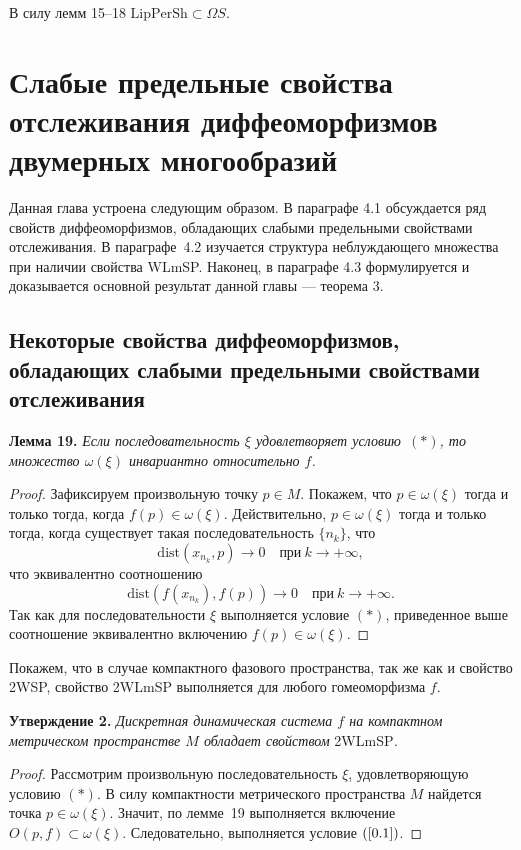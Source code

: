 \documentclass[12pt]{article}
\begin{document}
В силу лемм 15--18 $\mbox{LipPerSh}\subset\Omega S$.

\section{Слабые предельные свойства отслеживания диффеоморфизмов двумерных многообразий}

Данная глава устроена следующим образом. В параграфе 4.1 обсуждается ряд свойств диффеоморфизмов, обладающих слабыми предельными свойствами отслеживания. В параграфе~4.2 изучается структура неблуждающего множества при наличии свойства WLmSP. Наконец, в параграфе 4.3 формулируется и доказывается основной результат данной главы --- теорема 3.

\subsection{Некоторые свойства диффеоморфизмов, обладающих слабыми предельными свойствами отслеживания}

\textbf{Лемма 19.} \textit{Если последовательность $\xi$ удовлетворяет условию~$(*)$,  то множество $\omega(\xi)$ инвариантно относительно $f$.}

\begin{proof}
Зафиксируем произвольную точку $p\in M$. Покажем, что $p\in\omega(\xi)$ тогда и только тогда, когда $f(p)\in\omega(\xi)$.
 Действительно, $p\in\omega(\xi)$ тогда и только тогда, когда существует такая последовательность $\{n_k\}$, что $$\mbox{dist}(x_{n_k},p)\longrightarrow 0\quad\textrm{при}\ k\rightarrow+\infty,$$
 что эквивалентно соотношению
 $$\mbox{dist}(f(x_{n_k}),f(p))\longrightarrow 0\quad\textrm{при}\ k\rightarrow+\infty.$$
 Так как для последовательности $\xi$ выполняется условие $(*)$, приведенное выше соотношение эквивалентно включению
 $f(p)\in\omega(\xi)$.
\end{proof}

Покажем, что в случае компактного фазового пространства, так же как и свойство 2WSP, свойство 2WLmSP выполняется для любого гомеоморфизма $f$.
 
 \textbf{Утверждение 2.} \textit{Дискретная динамическая система $f$ на компактном метричес\-ком пространстве $M$ обладает свойством} 2WLmSP\textit{.}

\begin{proof}
Рассмотрим произвольную последовательность $\xi$, удовлетворяющую условию $(*)$. %
В силу компактности метрического пространства $M$ найдется точка $p\in\omega(\xi)$. Значит, по лемме~19 выполняется включение $O(p,f)\subset\omega(\xi)$. Следовательно, выполняется условие $(\ref{0.1})$.
\end{proof}
\end{document}
